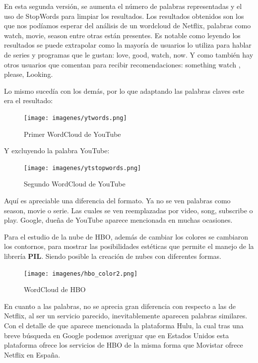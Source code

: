 En esta segunda versión, se aumenta el número de palabras representadas y el uso de StopWords para limpiar los resultados. Los resultados obtenidos son los que nos podíamos esperar del análisis de un wordcloud de Netflix, palabras como watch, movie, season entre otras están presentes. Es notable como leyendo los resultados se puede extrapolar como la mayoría de usuarios lo utiliza para hablar de series y programas que le gustan: love, good, watch, now. Y como también hay otros usuarios que comentan para recibir recomendaciones: something watch ,  please, Looking. 

Lo mismo sucedía con los demás, por lo que adaptando las palabras claves este era el resultado: 

\begin{figure}[H]
	\centering
	\texttt{[image: imagenes/ytwords.png]}
	\caption{Primer WordCloud de YouTube}
	\label{fig:wordcloudYT1}
\end{figure} 

Y excluyendo la palabra YouTube: 

\begin{figure}[H]
	\centering
	\texttt{[image: imagenes/ytstopwords.png]}
	\caption{Segundo WordCloud de YouTube}
	\label{fig:wordcloudYT2}
\end{figure} 


Aquí es apreciable una diferencia del formato. Ya no se ven palabras como season, movie o serie. Las cuales se ven reemplazadas por video, song, subscribe o play. Google, dueña de YouTube aparece mencionada en muchas ocasiones. 
 
Para el estudio de la nube de HBO, además de cambiar los colores se cambiaron los contornos, para mostrar las posibilidades estéticas que permite el manejo de la librería \textbf{PIL}\cite{Pillow}. Siendo posible la creación de nubes con diferentes formas. 

\begin{figure}[h]
	\centering
	\texttt{[image: imagenes/hbo\_color2.png]}
	\caption{WordCloud de HBO}
	\label{fig:wordcloudHBO}
\end{figure} 

En cuanto a las palabras, no se aprecia gran diferencia con respecto a las de Netflix, al ser un servicio parecido, inevitablemente aparecen palabras similares. Con el detalle de que aparece mencionada la plataforma Hulu, la cual tras una breve búsqueda en Google podemos averiguar que en Estados Unidos esta plataforma ofrece los servicios de HBO de la misma forma que Movistar ofrece Netflix en España. 




